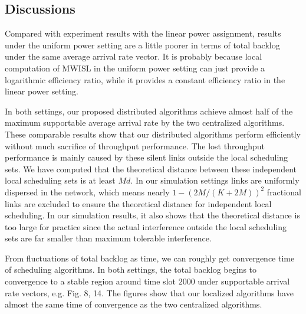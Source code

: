 \documentclass[journal]{IEEEtran}
\begin{document}
\subsection{Discussions }
Compared with experiment results with the linear power assignment, results under the uniform power setting are a little poorer in terms of total backlog under the same average arrival rate vector. It is probably because local computation of MWISL in the uniform power setting can just provide a logarithmic efficiency ratio, while it provides a constant efficiency ratio in the linear power setting.

In both settings, our proposed distributed algorithms achieve almost half of the maximum supportable average arrival rate by the two centralized algorithms. These comparable results show that our distributed algorithms perform efficiently without much sacrifice of throughput performance. The lost throughput performance is mainly caused by these silent links outside the local scheduling sets.  We have computed that the theoretical distance  between these independent local scheduling sets is at least $Md$. In our simulation settings links are uniformly dispersed in the network, which means nearly $1-(2M/(K+2M))^2$ fractional links are excluded to ensure the theoretical distance for independent local scheduling. In our simulation results, it also shows that the theoretical distance is too large for practice since the actual interference outside the local scheduling sets are far smaller than maximum tolerable interference.

From fluctuations of total backlog as time, we can roughly get  convergence time of scheduling algorithms. In both settings, the total backlog begins to convergence to a stable region around time slot $2000$ under supportable arrival rate vectors, e.g. Fig. 8, 14. The figures show that our localized algorithms have almost the same time of convergence as the two centralized algorithms.
\end{document}
